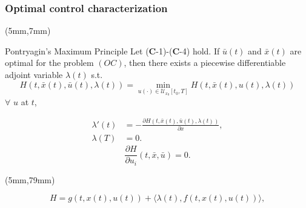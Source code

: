 \begin{frame}[plain]\frametitle{Optimal control characterization}
	\begin{textblock*}{120mm}(5mm,7mm)
		\begin{graybox}{Pontryagin’s Maximum Principle}
			Let ($\mathbf{C}$-1)-($\mathbf{C}$-4) hold. If $\bar{u}(t)$ and $\bar{x}(t)$ are optimal for the problem $(OC)$, then there exists a piecewise differentiable adjoint variable $\lambda(t)$ s.t.
				\begin{equation*}
					 H(t,\bar{x}(t),\bar{u}(t),\lambda(t))=\min_{u(\cdot)\in \mathcal{U}_{x_0}[t_0,T]}H(t,\bar{x}(t),u(t),\lambda(t))
				\end{equation*}
			$\forall$ $u$ at $t$,

				\begin{align*}
					\lambda'(t) &= -\frac{\partial H(t,\bar{x}(t),\bar{u}(t),\lambda(t))}{\partial x},\\
					\lambda(T) &= 0.
				\end{align*}
				\tcblower
					$$\frac{\partial H}{\partial u_i}(t,\bar{x},\bar{u})=0.$$
		\end{graybox}
		
	\end{textblock*}
		\begin{textblock*}{75mm}(5mm,79mm)
		\begin{yellowbox}{}
			\begin{equation*}
			H=g(t,x(t),u(t))+\langle \lambda(t),f(t,x(t),u(t))\rangle,
			\end{equation*}
		\end{yellowbox}
	\end{textblock*}

\end{frame}

